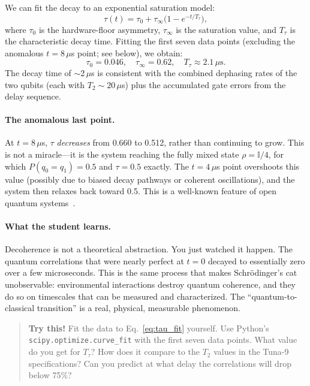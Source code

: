 \documentclass[amsmath,amssymb,reprint,aps,prb]{revtex4-2}
\begin{document}
We can fit the decay to an exponential saturation model:
\begin{equation}\label{eq:tau_fit}
\tau(t) = \tau_0 + \tau_\infty\bigl(1 - e^{-t/T_\tau}\bigr),
\end{equation}
where $\tau_0$ is the hardware-floor asymmetry, $\tau_\infty$ is
the saturation value, and $T_\tau$ is the characteristic decay
time.  Fitting the first seven data points (excluding the anomalous
$t = 8\,\mu$s point; see below), we obtain:
\begin{equation}
\tau_0 = 0.046,\quad \tau_\infty = 0.62,\quad
T_\tau \approx 2.1\,\mu\text{s}.
\end{equation}
The decay time of $\sim$2\,$\mu$s is consistent with the combined
dephasing rates of the two qubits (each with $T_2 \sim 20\,\mu$s)
plus the accumulated gate errors from the delay sequence.

\paragraph{The anomalous last point.}  At $t = 8\,\mu$s, $\tau$
\emph{decreases} from 0.660 to 0.512, rather than continuing to
grow.  This is not a miracle---it is the system reaching the fully
mixed state $\rho = \mathbb{I}/4$, for which $P(q_0 = q_1) = 0.5$
and $\tau = 0.5$ exactly.  The $t = 4\,\mu$s point overshoots this
value (possibly due to biased decay pathways or coherent
oscillations), and the system then relaxes back toward 0.5.
This is a well-known feature of open quantum
systems~\cite{BreuerPetruccione2002}.

\paragraph{What the student learns.}
Decoherence is not a theoretical abstraction.  You just watched it
happen.  The quantum correlations that were nearly perfect at $t=0$
decayed to essentially zero over a few microseconds.  This is the
same process that makes Schr\"{o}dinger's cat unobservable:
environmental interactions destroy quantum coherence, and they do so
on timescales that can be measured and characterized.  The
``quantum-to-classical transition'' is a real, physical, measurable
phenomenon.

\begin{quote}
\textbf{Try this!}  Fit the data to Eq.~\eqref{eq:tau_fit}
yourself.  Use Python's \texttt{scipy.optimize.curve\_fit} with
the first seven data points.  What value do you get for $T_\tau$?
How does it compare to the $T_2$ values in the Tuna-9
specifications?  Can you predict at what delay the correlations
will drop below 75\%?
\end{quote}
\end{document}
